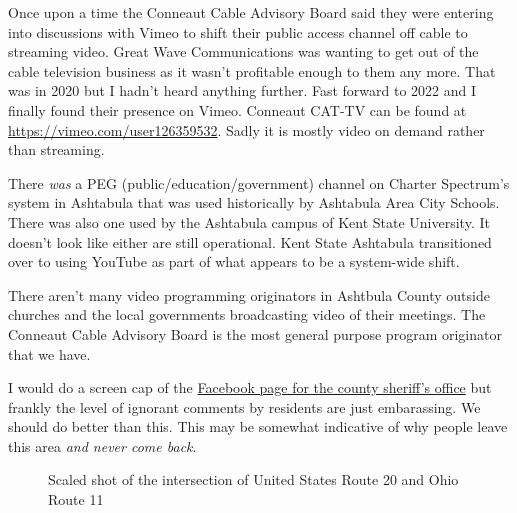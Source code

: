 Once upon a time the Conneaut Cable Advisory Board said they were
entering into discussions with Vimeo to shift their public access
channel off cable to streaming video. Great Wave Communications was
wanting to get out of the cable television business as it wasn't
profitable enough to them any more. That was in 2020 but I hadn't heard
anything further. Fast forward to 2022 and I finally found their
presence on Vimeo. Conneaut CAT-TV can be found at
\url{https://vimeo.com/user126359532}. Sadly it is mostly video on
demand rather than streaming.

There \emph{was} a PEG (public/education/government) channel on Charter
Spectrum's system in Ashtabula that was used historically by Ashtabula
Area City Schools. There was also one used by the Ashtabula campus of
Kent State University. It doesn't look like either are still
operational. Kent State Ashtabula transitioned over to using YouTube as
part of what appears to be a system-wide shift.

There aren't many video programming originators in Ashtbula County
outside churches and the local governments broadcasting video of their
meetings. The Conneaut Cable Advisory Board is the most general purpose
program originator that we have.

I would do a screen cap of the
\href{https://www.facebook.com/ashtabulacountyso/}{Facebook page for the
county sheriff's office} but frankly the level of ignorant comments by
residents are just embarassing. We should do better than this. This may
be somewhat indicative of why people leave this area \emph{and never
come back}.

\begin{figure}
\centering
{}
\caption{Scaled shot of the intersection of United States Route 20 and
Ohio Route 11}
\end{figure}
